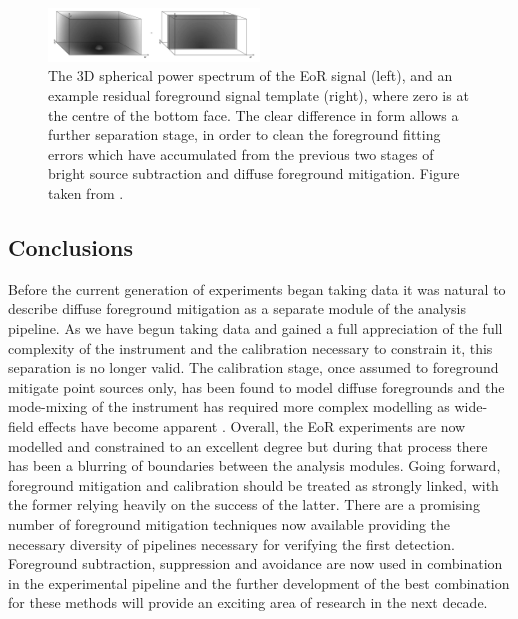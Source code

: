 \begin{figure}
\begin{center}
    \includegraphics[width=0.5\textwidth]{Images/res_sub.png}
\end{center}
    \caption{The 3D spherical power spectrum of the EoR signal (left), and an example residual foreground signal template (right), where zero is at the centre of the bottom face. The clear difference in form allows a further separation stage, in order to clean the foreground fitting errors which have accumulated from the previous two stages of bright source subtraction and diffuse foreground mitigation. Figure taken from \citet{Morales2006ApJ...648..767M}.}
    \label{fig:ressub}
\end{figure}

\subsection{Conclusions}
Before the current generation of experiments began taking data it was natural to describe diffuse foreground mitigation as a separate module of the analysis pipeline. As we have begun taking data and gained a full appreciation of the full complexity of the instrument and the calibration necessary to constrain it, this separation is no longer valid. The calibration stage, once assumed to foreground mitigate point sources only, has been found to model diffuse foregrounds \citet{Patil2016MNRAS.463.4317P} and the mode-mixing of the instrument has required more complex modelling as wide-field effects have become apparent \citet{Thyagarajan2015ApJ...807L..28T}. Overall, the EoR experiments are now modelled and constrained to an excellent degree but during that process there has been a blurring of boundaries between the analysis modules. Going forward, foreground mitigation and calibration should be treated as strongly linked, with the former relying heavily on the success of the latter. There are a promising number of foreground mitigation techniques now available providing the necessary diversity of pipelines necessary for verifying the first detection. Foreground subtraction, suppression and avoidance are now used in combination in the experimental pipeline and the further development of the best combination for these methods will provide an exciting area of research in the next decade.






